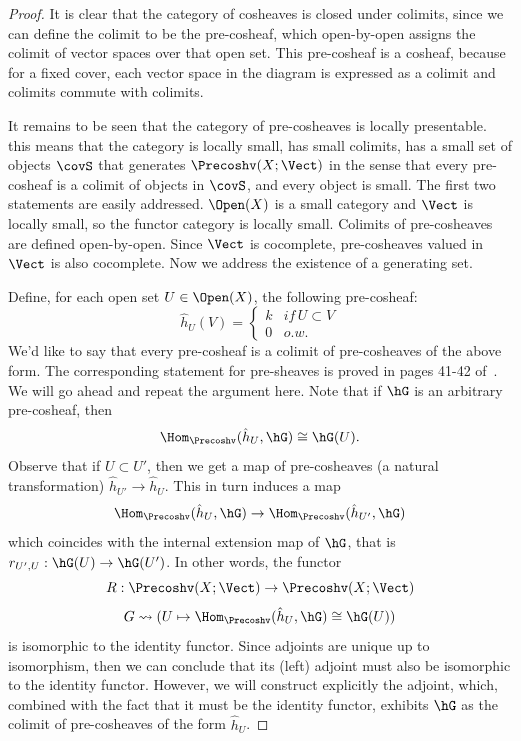 \begin{proof}
It is clear that the category of cosheaves is closed under colimits, since we can define the colimit to be the pre-cosheaf, which open-by-open assigns the colimit of vector spaces over that open set. This pre-cosheaf is a cosheaf, because for a fixed cover, each vector space in the diagram is expressed as a colimit and colimits commute with colimits.

It remains to be seen that the category of pre-cosheaves is locally presentable. this means that the category is locally small, has small colimits, has a small set of objects $\covS$ that generates $\Precoshv(X;\Vect)$ in the sense that every pre-cosheaf is a colimit of objects in $\covS$, and every object is small. The first two statements are easily addressed. $\Open(X)$ is a small category and $\Vect$ is locally small, so the functor category is locally small. Colimits of pre-cosheaves are defined open-by-open. Since $\Vect$ is cocomplete, pre-cosheaves valued in $\Vect$ is also cocomplete. Now we address the existence of a generating set. 

Define, for each open set $U\in \Open(X)$, the following pre-cosheaf:
\[
\hat{h}_U(V)=\left\{\begin{array}{ll} k & if\, U\subset V \\ 0 & o.w.\end{array}\right.
\]
We'd like to say that every pre-cosheaf is a colimit of pre-cosheaves of the above form. The corresponding statement for pre-sheaves is proved in pages 41-42 of~\cite{mm-topos}. We will go ahead and repeat the argument here. Note that if $\hG$ is an arbitrary pre-cosheaf, then
\[
\Hom_{\Precoshv}(\hat{h}_U,\hG)\cong \hG(U).
\]
Observe that if $U\subset U'$, then we get a map of pre-cosheaves (a natural transformation) $\hat{h}_{U'}\to \hat{h}_{U}$. This in turn induces a map
\[
\Hom_{\Precoshv}(\hat{h}_U,\hG)\to \Hom_{\Precoshv}(\hat{h}_{U'},\hG)
\]
which coincides with the internal extension map of $\hG$, that is $r_{U',U}:\hG(U)\to \hG(U')$. In other words, the functor
\[
R:\Precoshv(X;\Vect)\to\Precoshv(X;\Vect)
\] 
\[
G \rightsquigarrow (U\mapsto \Hom_{\Precoshv}(\hat{h}_U,\hG)\cong \hG(U))
\]
is isomorphic to the identity functor. Since adjoints are unique up to isomorphism, then we can conclude that its (left) adjoint must also be isomorphic to the identity functor. However, we will construct explicitly the adjoint, which, combined with the fact that it must be the identity functor, exhibits $\hG$ as the colimit of pre-cosheaves of the form $\hat{h}_U$.


\end{proof}
